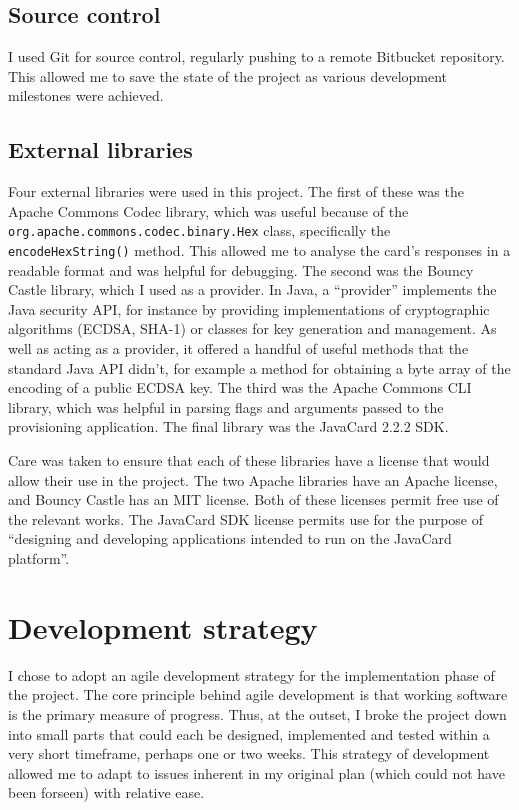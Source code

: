 \documentclass[12pt,a4paper,twoside,openright]{report}
\begin{document}
\subsection{Source control}

I used Git for source control, regularly pushing to a remote Bitbucket repository. This allowed me to save the state of the project as various development milestones were achieved.

\subsection{External libraries}

Four external libraries were used in this project. The first of these was the Apache Commons Codec \cite{apachecommonscodec} library, which was useful because of the \texttt{org.apache.commons.codec.binary.Hex} class, specifically the \texttt{encodeHexString()} method. This allowed me to analyse the card's responses in a readable format and was helpful for debugging. The second was the Bouncy Castle \cite{bouncycastle} library, which I used as a provider. In Java, a ``provider'' implements the Java security API, for instance by providing implementations of cryptographic algorithms (ECDSA, SHA-1) or classes for key generation and management. As well as acting as a provider, it offered a handful of useful methods that the standard Java API didn't, for example a method for obtaining a byte array of the encoding of a public ECDSA key. The third was the Apache Commons CLI \cite{apachecommonscli} library, which was helpful in parsing flags and arguments passed to the provisioning application. The final library was the JavaCard 2.2.2 SDK.

Care was taken to ensure that each of these libraries have a license that would allow their use in the project. The two Apache libraries have an Apache license, and Bouncy Castle has an MIT license. Both of these licenses permit free use of the relevant works. The JavaCard SDK license permits use for the purpose of ``designing and developing applications intended to run on the JavaCard platform''.

\section{Development strategy}

I chose to adopt an agile development strategy for the implementation phase of the project. The core principle behind agile development is that working software is the primary measure of progress. Thus, at the outset, I broke the project down into small parts that could each be designed, implemented and tested within a very short timeframe, perhaps one or two weeks. This strategy of development allowed me to adapt to issues inherent in my original plan (which could not have been forseen) with relative ease.
\end{document}

